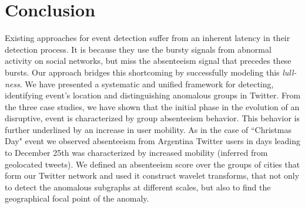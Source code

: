 \section{Conclusion}
\label{sec:conclusion}
Existing approaches for event detection suffer from an inherent latency in their detection process. It is because they use the bursty signals from abnormal activity on social networks, but miss the absenteeism signal that precedes these bursts. Our approach bridges this shortcoming by successfully modeling this \textit{lull-ness}. We have presented a systematic and unified framework for detecting, identifying event's location and distinguishing anomalous groups in Twitter. From the three case studies, we have shown that the initial phase in the evolution of an disruptive, event is characterized by group absenteeism behavior. This behavior is further underlined by an increase in user mobility. As in the case of ``Christmas Day" event we observed absenteeism from Argentina Twitter users in days leading to December 25th was characterized by increased mobility (inferred from geolocated tweets). We defined an absenteeism score over the groups of cities that form our Twitter network and used it construct wavelet transforms, that not only to detect the anomalous subgraphs at different scales, but also to find the geographical focal point of the anomaly.

